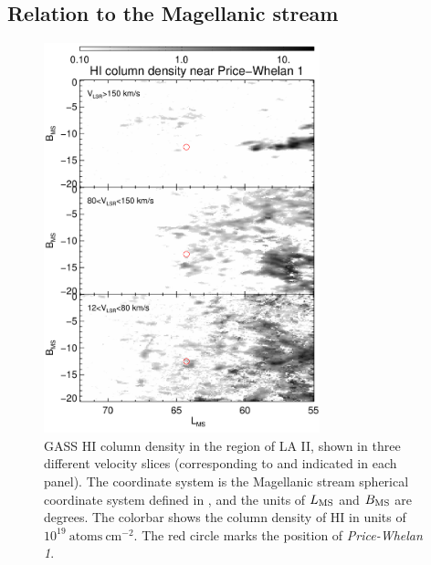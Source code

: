\documentclass[twocolumn]{aastex62}
\newcommand{\hi}{H{\footnotesize I} }
\newcommand{\clustername}{\textsl{Price-Whelan 1}}
\begin{document}
\subsection{Relation to the Magellanic stream}
\label{sec:higas}

\begin{figure}[t]
\centering
\includegraphics[width=8cm]{figures/gass_maps_v3.pdf}
\caption{GASS \hi column density in the region of LA II, shown in three different velocity slices (corresponding to and indicated in each panel).
The coordinate system is the Magellanic stream spherical coordinate system defined in \cite{Nidever:2008}, and the units of $L_{\rm MS}$ and $B_{\rm MS}$ are degrees.
The colorbar shows the column density of \hi in units of $10^{19}~\textrm{atoms}~\textrm{cm}^{-2}$.
The red circle marks the position of \clustername.}
\label{fig:gass_maps}
\end{figure}
\end{document}
